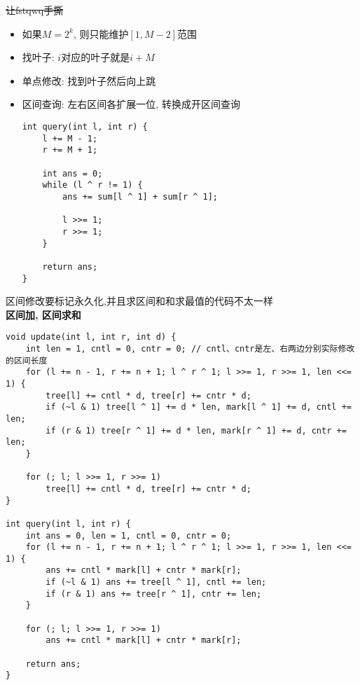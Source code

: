 \sout{让fstqwq手撕}

\begin{itemize}
	\item 如果$M = 2^k$, 则只能维护$[1, M - 2]$范围
	\item 找叶子: $i$对应的叶子就是$i + M$
	\item 单点修改: 找到叶子然后向上跳
	\item 区间查询: 左右区间各扩展一位, 转换成开区间查询
\begin{verbatim}
int query(int l, int r) {
    l += M - 1;
    r += M + 1;

    int ans = 0;
    while (l ^ r != 1) {
        ans += sum[l ^ 1] + sum[r ^ 1];

        l >>= 1;
        r >>= 1;
    }

    return ans;
}
\end{verbatim}

\end{itemize}
	
区间修改要标记永久化,并且求区间和和求最值的代码不太一样 \\

\textbf{区间加, 区间求和}
\begin{verbatim}
void update(int l, int r, int d) {
    int len = 1, cntl = 0, cntr = 0; // cntl、cntr是左、右两边分别实际修改的区间长度
    for (l += n - 1, r += n + 1; l ^ r ^ 1; l >>= 1, r >>= 1, len <<= 1) {
        tree[l] += cntl * d, tree[r] += cntr * d;
        if (~l & 1) tree[l ^ 1] += d * len, mark[l ^ 1] += d, cntl += len;
        if (r & 1) tree[r ^ 1] += d * len, mark[r ^ 1] += d, cntr += len;
    }

    for (; l; l >>= 1, r >>= 1)
        tree[l] += cntl * d, tree[r] += cntr * d;
}

int query(int l, int r) {
    int ans = 0, len = 1, cntl = 0, cntr = 0;
    for (l += n - 1, r += n + 1; l ^ r ^ 1; l >>= 1, r >>= 1, len <<= 1) {
        ans += cntl * mark[l] + cntr * mark[r];
        if (~l & 1) ans += tree[l ^ 1], cntl += len;
        if (r & 1) ans += tree[r ^ 1], cntr += len;
    }

    for (; l; l >>= 1, r >>= 1)
        ans += cntl * mark[l] + cntr * mark[r];

    return ans;
}
\end{verbatim}

